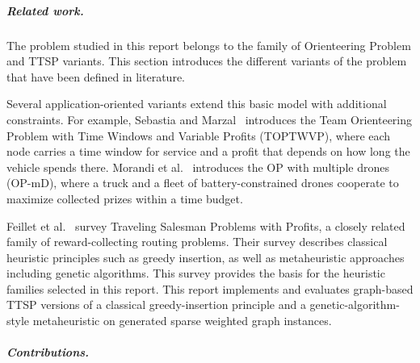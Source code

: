 \documentclass[report,english,cleveref,autoref,a4paper]{lipics-v2021}
\newcommand{\explanation}[1]{\emph{Explanation:} #1}
\newcommand{\explanation}[1]{}
\begin{document}
\subparagraph{Related work.}


The problem studied in this report belongs to the family of Orienteering
Problem and TTSP variants. This section introduces the different variants 
of the problem that have been defined in literature.

Several application-oriented variants extend this basic model with additional
constraints. For example, Sebastia and Marzal~\cite{MarzalSebastia2024} introduces the Team Orienteering Problem with Time Windows and Variable Profits (TOPTWVP), where each node carries a time window for service and a profit that depends on how long the vehicle spends there. Morandi et al.~\cite{MorandiLeusYaman2024} introduces the OP with multiple drones (OP-mD), where a truck and a fleet of battery-constrained drones cooperate to maximize collected prizes within a time budget. 

Feillet et al.~\cite{feillet2005traveling} survey Traveling Salesman Problems
with Profits, a closely related family of reward-collecting routing problems.
Their survey describes classical heuristic principles such as greedy insertion,
as well as metaheuristic approaches including genetic algorithms. This survey
provides the basis for the heuristic families selected in this report. This
report implements and evaluates graph-based TTSP versions of a classical
greedy-insertion principle and a genetic-algorithm-style metaheuristic on
generated sparse weighted graph instances.

\subparagraph{Contributions.}
\end{document}
